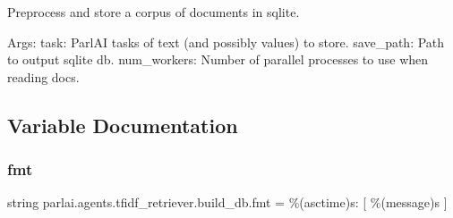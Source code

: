 \begin{DoxyVerb}Preprocess and store a corpus of documents in sqlite.

Args:
    task: ParlAI tasks of text (and possibly values) to store.
    save_path: Path to output sqlite db.
    num_workers: Number of parallel processes to use when reading docs.
\end{DoxyVerb}
 

\subsection{Variable Documentation}
\mbox{\label{namespaceparlai_1_1agents_1_1tfidf__retriever_1_1build__db_a7a8b2cb13da2ca64f153da8af410072e}} 
\subsubsection{\texorpdfstring{fmt}{fmt}}
{\footnotesize\ttfamily string parlai.\+agents.\+tfidf\+\_\+retriever.\+build\+\_\+db.\+fmt = \textquotesingle{}\%(asctime)s\+: \mbox{[} \%(message)s \mbox{]}\textquotesingle{}}

